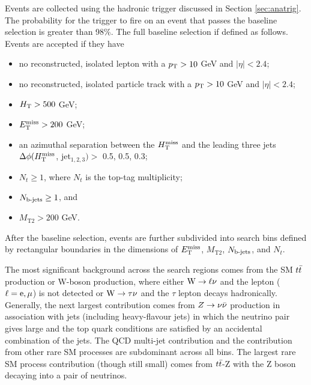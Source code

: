 Events are collected using the hadronic trigger discussed in Section \ref{sec:anatrig}. The probability for the trigger to fire on an event that passes the baseline selection is greater than 98\%. The full baseline selection if defined as follows. Events are accepted if they have
\begin{itemize}
\item no reconstructed, isolated lepton with a $p_{\text{T}}>10$ GeV and $|\eta|<2.4$;
\item no reconstructed, isolated particle track with a $p_{\text{T}}>10$ GeV and $|\eta|<2.4$;
\item $H_{\rm T}>500$ GeV;
\item $E_{\text{T}}^{\rm miss}>200$ GeV;
\item an azimuthal separation between the $H_{\text{T}}^{\rm miss}$ and the leading three jets $\Delta\phi(H_{\text{T}}^{\rm miss}$, jet$_{1,2,3})>$ 0.5, 0.5, 0.3;
\item $N_t\geq1$, where $N_t$ is the top-tag multiplicity;
\item $N_{\text{b-jets}}\geq1$, and
\item $M_{\text{T2}}>200$ GeV.
\end{itemize}
After the baseline selection, events are further subdivided into search bins defined by rectangular boundaries in the dimensions of $E_{\text{T}}^{\rm miss}$, $M_{\text{T2}}$, $N_{\text{b-jets}}$, and $N_t$. 

The most significant background across the search regions comes from the SM $t\bar{t}$ production or W-boson production, where either ${\rm W}\rightarrow \ell\nu$ and the lepton ($\ell={\rm e},\mu$) is not detected or ${\rm W}\rightarrow \tau\nu$ and the $\tau$ lepton decays hadronically. Generally, the next largest contribution comes from $Z\rightarrow \nu\bar{\nu}$ production in association with jets (including heavy-flavour jets) in which the neutrino pair gives large \MET and the top quark conditions are satisfied by an accidental combination of the jets. The QCD multi-jet contribution and the contribution from other rare SM processes are subdominant across all bins. The largest rare SM process contribution (though still small) comes from $t\bar{t}$-Z with the Z boson decaying into a pair of neutrinos.  


